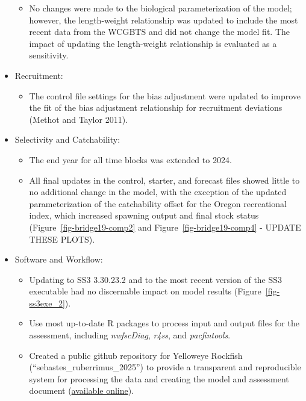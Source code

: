 \documentclass[
]{scrartcl}
\providecommand{\tightlist}{%
  \setlength{\itemsep}{0pt}\setlength{\parskip}{0pt}}\usepackage{longtable,booktabs,array}
\begin{document}
\begin{itemize}
  \begin{itemize}
  \tightlist
  \item
    No changes were made to the biological parameterization of the
    model; however, the length-weight relationship was updated to
    include the most recent data from the WCGBTS and did not change the
    model fit. The impact of updating the length-weight relationship is
    evaluated as a sensitivity.
  \end{itemize}
\item
  Recruitment:

  \begin{itemize}
  \tightlist
  \item
    The control file settings for the bias adjustment were updated to
    improve the fit of the bias adjustment relationship for recruitment
    deviations (Methot and Taylor 2011).
  \end{itemize}
\item
  Selectivity and Catchability:

  \begin{itemize}
  \tightlist
  \item
    The end year for all time blocks was extended to 2024.
  \item
    All final updates in the control, starter, and forecast files showed
    little to no additional change in the model, with the exception of
    the updated parameterization of the catchability offset for the
    Oregon recreational index, which increased spawning output and final
    stock status (Figure~\ref{fig-bridge19-comp2} and
    Figure~\ref{fig-bridge19-comp4} - UPDATE THESE PLOTS).
  \end{itemize}
\item
  Software and Workflow:

  \begin{itemize}
  \tightlist
  \item
    Updating to SS3 3.30.23.2 and to the most recent version of the SS3
    executable had no discernable impact on model results
    (Figure~\ref{fig-ss3exe_2}).
  \item
    Use most up-to-date R packages to process input and output files for
    the assessment, including \emph{nwfscDiag}, \emph{r4ss}, and
    \emph{pacfintools}.
  \item
    Created a public github repository for Yelloweye Rockfish
    (``sebastes\_ruberrimus\_2025'') to provide a transparent and
    reproducible system for processing the data and creating the model
    and assessment document
    (\href{https://github.com/rclairer/Sebastes_ruberrimus_2025}{available
    online}).
  \end{itemize}
\end{itemize}
\end{document}
